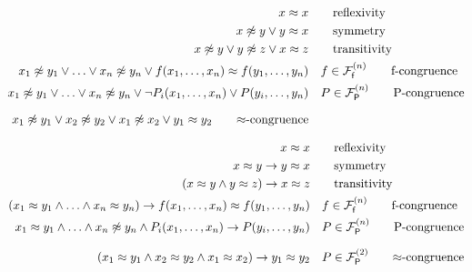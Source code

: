 \begin{align*}
	 x \mEQ x & \tag*{reflexivity} \\
	x \mNE y \lor y \mEQ x & \tag*{symmetry}\\
	x\mNE y\lor y\mNE z\lor x\mEQ z & \tag*{transitivity} \\
	x_1 \mNE y_1\lor\ldots\lor x_n \mNE y_n\lor f(x_1,\ldots,x_n)\mEQ f(y_1,\ldots,y_n) &\quad f\in\mcFfn
	\tag*{f-congruence}
	\\
	x_1\mNE y_1\lor\ldots\lor x_n\mNE y_n\lor\lnot P_i(x_1,\ldots,x_n)\lor P(y_i,\ldots,y_n) &\quad P\in\mcFPn
	\tag*{P-congruence}
	\\[0.7em]
	x_1\mNE y_1\lor x_2\mNE y_2
	\lor x_1\mNE x_2
	\lor y_1\mEQ y_2
	\tag*{$\mEQ$-congruence}
\end{align*}

\begin{align*}
	x \mEQ x & \tag*{reflexivity} 
	\\
	x \mEQ y \limp y \mEQ x & \tag*{symmetry}
	\\
	(x\mEQ y\land y\mEQ z)\limp x\mEQ z & \tag*{transitivity} 
	\\
	(x_1 \mEQ y_1\land\ldots\land x_n \mEQ y_n)\limp f(x_1,\ldots,x_n)\mEQ f(y_1,\ldots,y_n) &\quad f\in\mcFfn
	\tag*{f-congruence}
	\\
	x_1\mEQ y_1\land\ldots\land x_n\mNE y_n\land P_i(x_1,\ldots,x_n)
	\limp P(y_i,\ldots,y_n) &\quad P\in\mcFPn
	\tag*{P-congruence}
	\\[0.7em]
	(x_1\mEQ y_1
	\land x_2\mEQ y_2
	\land x_1\mEQ x_2)
	\limp y_1\mEQ y_2
	& \quad P\in\mcFPn[2]
		\tag*{$\mEQ$-congruence}
\end{align*}
	
	








